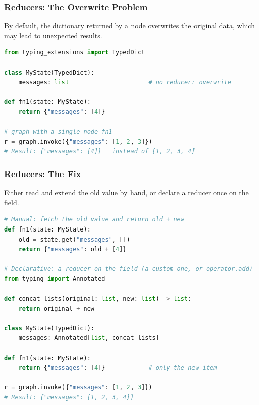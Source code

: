 \begin{frame}[fragile]\frametitle{Reducers: The Overwrite Problem}

By default, the dictionary returned by a node overwrites the original data, which may lead to unexpected results.

\begin{lstlisting}[language=Python]
from typing_extensions import TypedDict

class MyState(TypedDict):
    messages: list                      # no reducer: overwrite

def fn1(state: MyState):
    return {"messages": [4]}

# graph with a single node fn1
r = graph.invoke({"messages": [1, 2, 3]})
# Result: {"messages": [4]}   instead of [1, 2, 3, 4]
\end{lstlisting}
\end{frame}
\begin{frame}[fragile]\frametitle{Reducers: The Fix}

Either read and extend the old value by hand, or declare a reducer once on the field.

\begin{lstlisting}[language=Python]
# Manual: fetch the old value and return old + new
def fn1(state: MyState):
    old = state.get("messages", [])
    return {"messages": old + [4]}

# Declarative: a reducer on the field (a custom one, or operator.add)
from typing import Annotated

def concat_lists(original: list, new: list) -> list:
    return original + new

class MyState(TypedDict):
    messages: Annotated[list, concat_lists]

def fn1(state: MyState):
    return {"messages": [4]}            # only the new item

r = graph.invoke({"messages": [1, 2, 3]})
# Result: {"messages": [1, 2, 3, 4]}
\end{lstlisting}
\end{frame}
